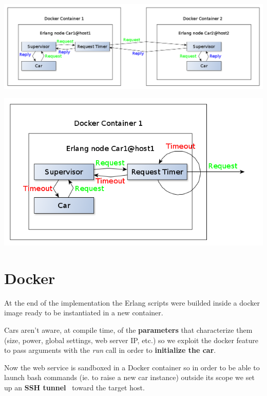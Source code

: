 \begin{center}
    \includegraphics[scale=0.3]{assets/request-track.png}
\end{center}
\begin{center}
    \includegraphics[scale=0.3]{assets/request-timeout.png}
\end{center}


\section{Docker}

At the end of the implementation the Erlang scripts were builded inside a docker image 
ready to be instantiated in a new container. 

Cars aren't aware, at compile time, of the \textbf{parameters} that characterize them 
(size, power, global settings, web server IP, etc.) so we exploit 
the docker feature to pass arguments with the \textit{run} call in order to 
\textbf{initialize the car}.  

Now the web service is sandboxed in a Docker container so in order to be able to launch 
bash commands (ie. to raise a new car instance) outside its scope we set up an 
\textbf{SSH tunnel}~\cite{15} toward the target host.


